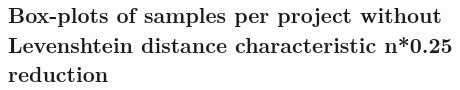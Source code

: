\begin{appendices}
\chapter{Box-plots of samples per project without Levenshtein distance characteristic n*0.25 reduction}
\label{ap:no_distance_25}
\begin{figure}[h]
    \centering
    \qquad
\end{figure}


\end{appendices}
